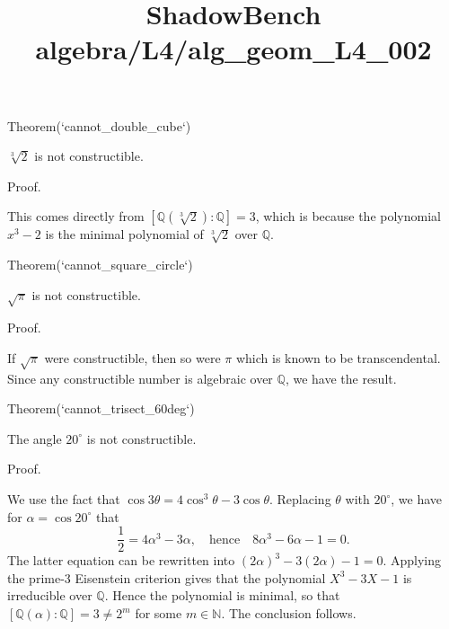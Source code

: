 \documentclass{article}
\title{ShadowBench algebra/L4/alg\_geom\_L4\_002}
\begin{document}
\maketitle

Theorem(`cannot_double_cube`)

$\sqrt[3]{2}$ is not constructible.

Proof.

This comes directly from $[\mathbb{Q}(\sqrt[3]{2}) : \mathbb{Q}] = 3$, which is because the polynomial $x^3 - 2$ is the minimal polynomial of $\sqrt[3]{2}$ over $\mathbb{Q}$.

Theorem(`cannot_square_circle`)

$\sqrt{\pi}$ is not constructible.

Proof.

If $\sqrt{\pi}$ were constructible, then so were $\pi$ which is known to be transcendental. Since any constructible number is algebraic over $\mathbb{Q}$, we have the result.

Theorem(`cannot_trisect_60deg`)

The angle $20^\circ$ is not constructible.

Proof.

We use the fact that $\cos 3\theta = 4 \cos^3 \theta - 3 \cos \theta$. Replacing $\theta$ with $20^\circ$, we have for $\alpha = \cos 20^\circ$ that
$$
\frac{1}{2} = 4\alpha^3 - 3\alpha, \quad \textrm{hence} \quad 8\alpha^3 - 6\alpha - 1 = 0.
$$
The latter equation can be rewritten into $(2\alpha)^3 - 3(2\alpha) - 1 = 0$. Applying the prime-3 Eisenstein criterion gives that the polynomial $X^3 - 3X - 1$ is irreducible over $\mathbb{Q}$. Hence the polynomial is minimal, so that $[\mathbb{Q}(\alpha) : \mathbb{Q}] = 3 \ne 2^m$ for some $m \in \mathbb{N}$. The conclusion follows.
\end{document}
